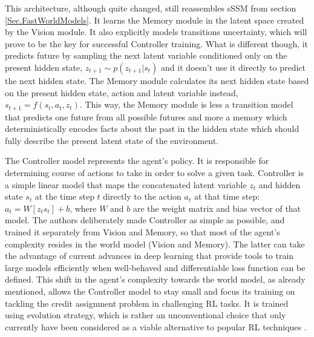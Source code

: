 This architecture, although quite changed, still reassembles sSSM from section \ref{Sec.FastWorldModels}. It learns the Memory module in the latent space created by the Vision module. It also explicitly models transitions uncertainty, which will prove to be the key for successful Controller training. What is different though, it predicts future by sampling the next latent variable conditioned only on the present hidden state, $z_{t+1} \sim p(z_{t+1}|s_t)$ and it doesn't use it directly to predict the next hidden state. The Memory module calculates its next hidden state based on the present hidden state, action and latent variable instead, $s_{t+1} = f(s_t, a_t, z_t)$. This way, the Memory module is less a transition model that predicts one future from all possible futures and more a memory which deterministically encodes facts about the past in the hidden state which should fully describe the present latent state of the environment.

The Controller model represents the agent's policy. It is responsible for determining course of actions to take in order to solve a given task. Controller is a simple linear model that maps the concatenated latent variable $z_t$ and hidden state $s_t$ at the time step $t$ directly to the action $a_t$ at that time step: $a_t = W[z_t s_t] + b$, where $W$ and $b$ are the weight matrix and bias vector of that model.
The authors deliberately made Controller as simple as possible, and trained it separately from Vision and Memory, so that most of the agent's complexity resides in the world model (Vision and Memory). The latter can take the advantage of current advances in deep learning that provide tools to train large models efficiently when well-behaved and differentiable loss function can be defined.
This shift in the agent's complexity towards the world model, as already mentioned, allows the Controller model to stay small and focus its training on tackling the credit assignment problem in challenging RL tasks. It is trained using evolution strategy, which is rather an unconventional choice that only currently have been considered as a viable alternative to popular RL techniques \cite{Algo.ESRL}.


